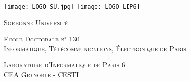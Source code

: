 \documentclass[
11pt, %
english, %
singlespacing, %
headsepline, %
]{MastersDoctoralThesis} %
\author{Eleonora \textsc{CAGLI}} %
\theoremstyle{remark}
\begin{document}
\frontmatter %

\pagestyle{plain} %


\begin{titlepage}
\texttt{[image: LOGO\_SU.jpg]}
\hfill
\texttt{[image: LOGO\_LIP6]}
\begin{center}

\vspace*{.02\textheight}
{\scshape\huge Sorbonne Universit\'e\par}\vspace{0.3cm} %
\textsc{\Large Ecole Doctorale n$^\circ$ 130 }\\
\textsc{\large Informatique, T\'el\'ecommunications, \'Electronique de Paris}\\[0.3cm]
\end{center}
\vspace*{.02\textheight}
\hfill \textsc{\large Laboratoire d'Informatique de Paris 6 }\\
\vspace*{.02\textheight}
\textsc{\large CEA Grenoble - CESTI} \hfill\\
\begin{center}
\noindent
{}\xrfill[0.7ex]{1pt} \\[0.3cm] %
{\scshape\huge \bfseries \ttitle\par}\vspace{0.4cm} %
\noindent
{}\xrfill[0.7ex]{1pt} \\[1.0cm] %





\end{center}
\end{titlepage}
\end{document}
